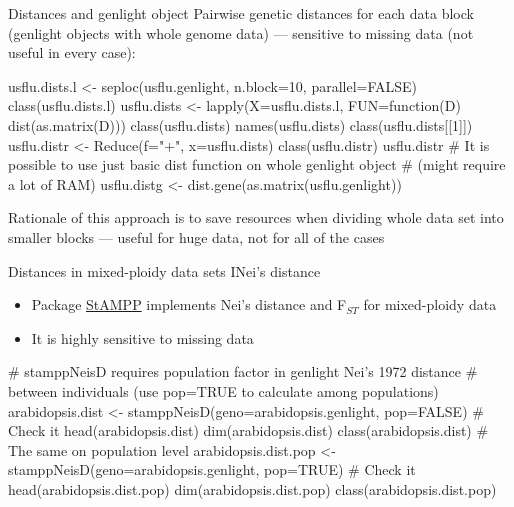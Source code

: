 \documentclass[compress, xelatex, 11pt, xcolor=svgnames, aspectratio=169,
	hyperref={
		bookmarks=true,
		unicode=true,
		colorlinks=true,
		pdftitle={Molecular data in R},
		plainpages=false,
		pdfauthor={Vojtech Zeisek},
		pdfsubject={Course about phylogeny and evolution in R},
		pdfcreator={XeLaTeX},
		pdfkeywords={R, evolution, phylogeny, molecular data},
		linkcolor=Crimson, %
		anchorcolor=Magenta, %
		citecolor=Magenta, %
		filecolor=Magenta, %
		menucolor=Magenta, %
		urlcolor=DodgerBlue, %
		},
	url={hyphens, lowtilde} %
	]{beamer}
\begin{document}
\begin{frame}[fragile]{Distances and genlight object}
	\vfill
	Pairwise genetic distances for each data block (genlight objects with whole genome data) --- sensitive to missing data (not useful in every case):
	\vfill
	\begin{spluscode}
    usflu.dists.l <- seploc(usflu.genlight, n.block=10, parallel=FALSE)
    class(usflu.dists.l)
    usflu.dists <- lapply(X=usflu.dists.l, FUN=function(D) dist(as.matrix(D)))
    class(usflu.dists)
    names(usflu.dists)
    class(usflu.dists[[1]])
    usflu.distr <- Reduce(f="+", x=usflu.dists)
    class(usflu.distr)
    usflu.distr
    # It is possible to use just basic dist function on whole genlight object
    # (might require a lot of RAM)
    usflu.distg <- dist.gene(as.matrix(usflu.genlight))
	\end{spluscode}
	\vfil
	Rationale of this approach is to save resources when dividing whole data set into smaller blocks --- useful for huge data, not for all of the cases
	\vfill
\end{frame}

\begin{frame}[fragile]{Distances in mixed-ploidy data sets I}{Nei's distance}
	\begin{itemize}
		\item Package \href{https://CRAN.R-project.org/package=StAMPP}{StAMPP} implements Nei's distance and F$_{ST}$ for mixed-ploidy data
		\item It is highly sensitive to missing data
	\end{itemize}
	\begin{spluscode}
    # stamppNeisD requires population factor in genlight Nei's 1972 distance
    # between individuals (use pop=TRUE to calculate among populations)
    arabidopsis.dist <- stamppNeisD(geno=arabidopsis.genlight, pop=FALSE)
    # Check it
    head(arabidopsis.dist)
    dim(arabidopsis.dist)
    class(arabidopsis.dist)
    # The same on population level
    arabidopsis.dist.pop <- stamppNeisD(geno=arabidopsis.genlight, pop=TRUE)
    # Check it
    head(arabidopsis.dist.pop)
    dim(arabidopsis.dist.pop)
    class(arabidopsis.dist.pop)
	\end{spluscode}
\end{frame}
\end{document}
